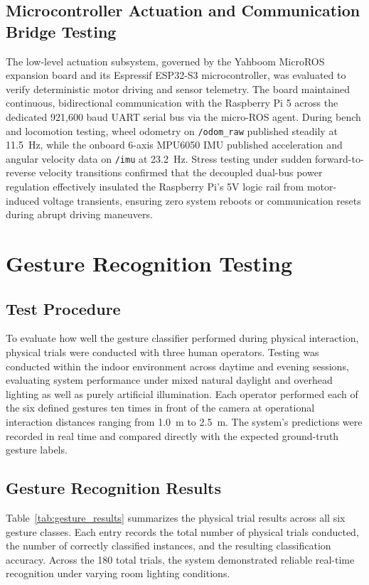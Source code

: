 \subsection{Microcontroller Actuation and Communication Bridge Testing}
The low-level actuation subsystem, governed by the Yahboom MicroROS expansion board and its Espressif ESP32-S3 microcontroller, was evaluated to verify deterministic motor driving and sensor telemetry. The board maintained continuous, bidirectional communication with the Raspberry Pi 5 across the dedicated 921,600 baud UART serial bus via the micro-ROS agent. During bench and locomotion testing, wheel odometry on \texttt{/odom\_raw} published steadily at 11.5~Hz, while the onboard 6-axis MPU6050 IMU published acceleration and angular velocity data on \texttt{/imu} at 23.2~Hz. Stress testing under sudden forward-to-reverse velocity transitions confirmed that the decoupled dual-bus power regulation effectively insulated the Raspberry Pi's 5V logic rail from motor-induced voltage transients, ensuring zero system reboots or communication resets during abrupt driving maneuvers.

\section{Gesture Recognition Testing}

\subsection{Test Procedure}
To evaluate how well the gesture classifier performed during physical interaction, physical trials were conducted with three human operators. Testing was conducted within the indoor environment across daytime and evening sessions, evaluating system performance under mixed natural daylight and overhead lighting as well as purely artificial illumination. Each operator performed each of the six defined gestures ten times in front of the camera at operational interaction distances ranging from 1.0~m to 2.5~m. The system's predictions were recorded in real time and compared directly with the expected ground-truth gesture labels.

\subsection{Gesture Recognition Results}
Table~\ref{tab:gesture_results} summarizes the physical trial results across all six gesture classes. Each entry records the total number of physical trials conducted, the number of correctly classified instances, and the resulting classification accuracy. Across the 180 total trials, the system demonstrated reliable real-time recognition under varying room lighting conditions.

